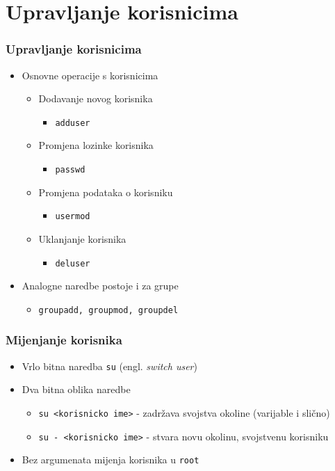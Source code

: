 \documentclass[table,usenames,dvipsnames] {beamer}
\newcommand{\shell}[1]{\texttt{#1}}
\begin{document}
\section{Upravljanje korisnicima}
\begin{frame}[t]
\frametitle{Upravljanje korisnicima}
\begin{itemize}
  \item Osnovne operacije s korisnicima
  \begin{itemize}
    \item Dodavanje novog korisnika
    \begin{itemize}
      \item[] \shell{adduser}
    \end{itemize}
    \item Promjena lozinke korisnika
    \begin{itemize}
      \item[] \shell{passwd}
    \end{itemize}
    \item Promjena podataka o korisniku
    \begin{itemize}
      \item[] \shell{usermod}
    \end{itemize}
    \item Uklanjanje korisnika
    \begin{itemize}
      \item[] \shell{deluser}
    \end{itemize}
  \end{itemize}
\end{itemize}
\begin{itemize}
	\item Analogne naredbe postoje i za grupe
	\begin{itemize}
		\item[] \shell{groupadd, groupmod, groupdel}
	\end{itemize}
\end{itemize}
\end{frame}

\begin{frame}[t]
\frametitle{Mijenjanje korisnika} 
\begin{itemize}
  \item Vrlo bitna naredba \shell{su} (engl. \emph{switch user})
  \item Dva bitna oblika naredbe
  \begin{itemize}
    \item \shell{su <korisnicko ime>} - zadržava svojstva okoline (varijable i slično)
    \item \shell{su - <korisnicko ime>} - stvara novu okolinu, svojstvenu korisniku
  \end{itemize}
  \item Bez argumenata mijenja korisnika u \shell{root}
\end{itemize}
\end{frame}
\end{document}
